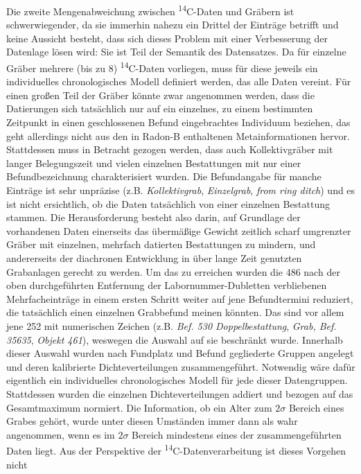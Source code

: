 \documentclass[openany,twoside,twocolumn]{book}
\begin{document}
Die zweite Mengenabweichung zwischen \textsuperscript{14}C-Daten und
Gräbern ist schwerwiegender, da sie immerhin nahezu ein Drittel der
Einträge betrifft und keine Aussicht besteht, dass sich dieses Problem
mit einer Verbesserung der Datenlage lösen wird: Sie ist Teil der
Semantik des Datensatzes. Da für einzelne Gräber mehrere (bis zu 8)
\textsuperscript{14}C-Daten vorliegen, muss für diese jeweils ein
individuelles chronologisches Modell definiert werden, das alle Daten
vereint. Für einen großen Teil der Gräber könnte zwar angenommen werden,
dass die Datierungen sich tatsächlich nur auf ein einzelnes, zu einem
bestimmten Zeitpunkt in einen geschlossenen Befund eingebrachtes
Individuum beziehen, das geht allerdings nicht aus den in Radon-B
enthaltenen Metainformationen hervor. Stattdessen muss in Betracht
gezogen werden, dass auch Kollektivgräber mit langer Belegungszeit und
vielen einzelnen Bestattungen mit nur einer Befundbezeichnung
charakterisiert wurden. Die Befundangabe für manche Einträge ist sehr
unpräzise (z.B. \emph{Kollektivgrab}, \emph{Einzelgrab}, \emph{from ring
ditch}) und es ist nicht ersichtlich, ob die Daten tatsächlich von einer
einzelnen Bestattung stammen. Die Herausforderung besteht also darin,
auf Grundlage der vorhandenen Daten einerseits das übermäßige Gewicht
zeitlich scharf umgrenzter Gräber mit einzelnen, mehrfach datierten
Bestattungen zu mindern, und andererseits der diachronen Entwicklung in
über lange Zeit genutzten Grabanlagen gerecht zu werden. Um das zu
erreichen wurden die 486 nach der oben durchgeführten Entfernung der
Labornummer-Dubletten verbliebenen Mehrfacheinträge in einem ersten
Schritt weiter auf jene Befundtermini reduziert, die tatsächlich einen
einzelnen Grabbefund meinen könnten. Das sind vor allem jene 252 mit
numerischen Zeichen (z.B. \emph{Bef. 530 Doppelbestattung}, \emph{Grab,
Bef. 35635}, \emph{Objekt 461}), weswegen die Auswahl auf sie beschränkt
wurde. Innerhalb dieser Auswahl wurden nach Fundplatz und Befund
gegliederte Gruppen angelegt und deren kalibrierte Dichteverteilungen
zusammengeführt. Notwendig wäre dafür eigentlich ein individuelles
chronologisches Modell für jede dieser Datengruppen. Stattdessen wurden
die einzelnen Dichteverteilungen addiert und bezogen auf das
Gesamtmaximum normiert. Die Information, ob ein Alter zum \(2\sigma\)
Bereich eines Grabes gehört, wurde unter diesen Umständen immer dann als
wahr angenommen, wenn es im \(2\sigma\) Bereich mindestens eines der
zusammengeführten Daten liegt. Aus der Perspektive der
\textsuperscript{14}C-Datenverarbeitung ist dieses Vorgehen nicht
\end{document}
